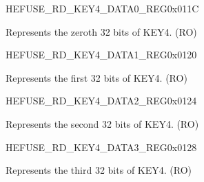 \begin{register}{H}{EFUSE\_RD\_KEY4\_DATA0\_REG}{0x011C}\label{regdesc:EFUSERDKEY4DATA0REG}
%
\regnewline%
\begin{regdesc}\begin{reglist}
\label{fielddesc:EFUSEKEY4DATA0}\item [EFUSE\_KEY4\_DATA0] Represents the zeroth 32 bits of KEY4. (RO)
\end{reglist}\end{regdesc}
\end{register}


\begin{register}{H}{EFUSE\_RD\_KEY4\_DATA1\_REG}{0x0120}\label{regdesc:EFUSERDKEY4DATA1REG}
%
\regnewline%
\begin{regdesc}\begin{reglist}
\label{fielddesc:EFUSEKEY4DATA1}\item [EFUSE\_KEY4\_DATA1] Represents the first 32 bits of KEY4. (RO)
\end{reglist}\end{regdesc}
\end{register}


\begin{register}{H}{EFUSE\_RD\_KEY4\_DATA2\_REG}{0x0124}\label{regdesc:EFUSERDKEY4DATA2REG}
%
\regnewline%
\begin{regdesc}\begin{reglist}
\label{fielddesc:EFUSEKEY4DATA2}\item [EFUSE\_KEY4\_DATA2] Represents the second 32 bits of KEY4. (RO)
\end{reglist}\end{regdesc}
\end{register}


\begin{register}{H}{EFUSE\_RD\_KEY4\_DATA3\_REG}{0x0128}\label{regdesc:EFUSERDKEY4DATA3REG}
%
\regnewline%
\begin{regdesc}\begin{reglist}
\label{fielddesc:EFUSEKEY4DATA3}\item [EFUSE\_KEY4\_DATA3] Represents the third 32 bits of KEY4. (RO)
\end{reglist}\end{regdesc}
\end{register}


